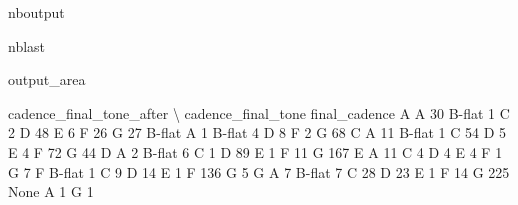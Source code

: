 \documentclass[letterpaper,10pt,english]{sphinxmanual}
\begin{document}
\begin{sphinxuseclass}{nboutput}
\begin{sphinxuseclass}{nblast}
{\begin{sphinxuseclass}{output_area}
\begin{sphinxuseclass}{}
\begin{sphinxVerbatim}[commandchars=\\\{\}]
                                  cadence\_final\_tone\_after  \textbackslash{}
cadence\_final\_tone final\_cadence
A                  A                                    30
                   B-flat                                1
                   C                                     2
                   D                                    48
                   E                                     6
                   F                                    26
                   G                                    27
B-flat             A                                     1
                   B-flat                                4
                   D                                     8
                   F                                     2
                   G                                    68
C                  A                                    11
                   B-flat                                1
                   C                                    54
                   D                                     5
                   E                                     4
                   F                                    72
                   G                                    44
D                  A                                     2
                   B-flat                                6
                   C                                     1
                   D                                    89
                   E                                     1
                   F                                    11
                   G                                   167
E                  A                                    11
                   C                                     4
                   D                                     4
                   E                                     4
                   F                                     1
                   G                                     7
F                  B-flat                                1
                   C                                     9
                   D                                    14
                   E                                     1
                   F                                   136
                   G                                     5
G                  A                                     7
                   B-flat                                7
                   C                                    28
                   D                                    23
                   E                                     1
                   F                                    14
                   G                                   225
None               A                                     1
                   G                                     1


\end{sphinxVerbatim}
\end{sphinxuseclass}
\end{sphinxuseclass}}
\end{sphinxuseclass}
\end{sphinxuseclass}
\end{document}

